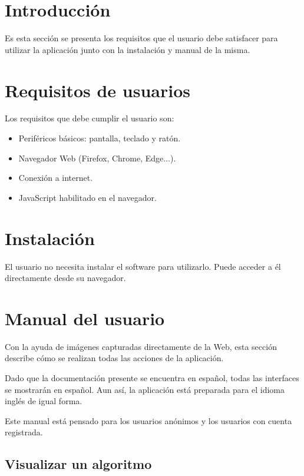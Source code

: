 
\section{Introducción}

Es esta sección se presenta los requisitos que el usuario debe satisfacer para
utilizar la aplicación junto con la instalación y manual de la misma.

\section{Requisitos de usuarios}

Los requisitos que debe cumplir el usuario son:
\begin{itemize}
    \item Periféricos básicos: pantalla, teclado y ratón.
    \item Navegador Web (Firefox, Chrome, Edge...).
    \item Conexión a internet.
    \item JavaScript habilitado en el navegador.
\end{itemize}

\section{Instalación}

El usuario no necesita instalar el software para utilizarlo. Puede acceder a él
directamente desde su navegador.

\section{Manual del usuario}

Con la ayuda de imágenes capturadas directamente de la Web, esta sección
describe cómo se realizan todas las acciones de la aplicación.

Dado que la documentación presente se encuentra en español, todas las interfaces
se mostrarán en español. Aun así, la aplicación está preparada para el idioma
inglés de igual forma.

Este manual está pensado para los usuarios anónimos y los usuarios con cuenta
registrada.

\subsection{Visualizar un algoritmo}

